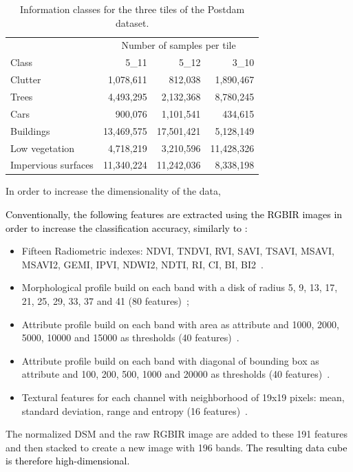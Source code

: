 \documentclass[journal,10pt]{IEEEtran}
\newcommand{\rev}[1]{\textcolor{black}{#1}}
\begin{document}
    \begin{table}[!t]
        \centering
        \caption{Information classes for the three tiles of the Postdam dataset.\label{tab:potsdam}}
        \begin{tabular}[b]{lrrr}\toprule
          & \multicolumn{3}{c}{Number of samples per tile}\\
            \cmidrule{2-4}
            Class &   5\_11  &   5\_12  & 3\_10 \\
          \midrule
          Clutter             & 1,078,611  & 812,038    & 1,890,467 \\
          Trees               & 4,493,295  & 2,132,368  & 8,780,245 \\
          Cars                & 900,076    & 1,101,541  & 434,615 \\
          Buildings           & 13,469,575 & 17,501,421 & 5,128,149 \\
          Low vegetation      & 4,718,219  & 3,210,596  & 11,428,326 \\
          Impervious surfaces & 11,340,224 & 11,242,036 & 8,338,198 \\
          \bottomrule
        \end{tabular}
    \end{table}

    In order to increase the dimensionality of the data,

    \rev{Conventionally,  the following  features are  extracted using  the
    RGBIR  images in  order to  increase the  classification accuracy,
    similarly to \cite{tuia2015multiclass}:}
    \begin{itemize}
        \item Fifteen Radiometric indexes: NDVI, TNDVI, RVI, SAVI, TSAVI, MSAVI, MSAVI2, GEMI, IPVI, NDWI2, NDTI, RI, CI, BI, BI2~\cite{otb}.
        \item Morphological profile build on each band with a disk of radius 5, 9, 13, 17, 21, 25, 29, 33, 37 and 41 (80 features)~\cite{fauvel2013advances};
        \item Attribute profile build on each band with area as attribute and 1000, 2000, 5000, 10000 and 15000 as thresholds (40 features)~\cite{dalla2010morphological}.
        \item Attribute profile build on each band with diagonal of bounding box as attribute and 100, 200, 500, 1000 and 20000 as thresholds (40 features)~\cite{dalla2010morphological}.
        \item Textural features for  each channel with neighborhood of
          19x19 pixels:  mean, standard  deviation, range  and entropy
          (16 features)~\cite{otb}.
    \end{itemize}
    The normalized DSM and the raw  RGBIR image are added to these 191
    features and  then stacked to create  a new image with  196 bands.
    \rev{The  resulting  data cube  is  therefore  high-dimensional.} 
    
\end{document}
